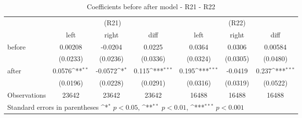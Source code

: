 \begin{table}[!ht]\centering \footnotesize
\def\sym#1{\ifmmode^{#1}\else\(^{#1}\)\fi}
\caption{Coefficients before after model - R21 - R22}
\begin{tabular}{l*{6}{c}}
\hline\hline
                    &\multicolumn{3}{c}{(R21)}&\multicolumn{3}{c}{(R22)}\\
&\multicolumn{1}{c}{left}&\multicolumn{1}{c}{right}&\multicolumn{1}{c}{diff}&\multicolumn{1}{c}{left}&\multicolumn{1}{c}{right}&\multicolumn{1}{c}{diff}\\
\hline
before              &     0.00208         &     -0.0204         &      0.0225         &      0.0364         &      0.0306         &     0.00584         \\
                    &    (0.0233)         &    (0.0236)         &    (0.0336)         &    (0.0324)         &    (0.0305)         &    (0.0480)         \\
[0.5em]
after               &      0.0576\sym{**} &     -0.0572\sym{*}  &       0.115\sym{***}&       0.195\sym{***}&     -0.0419         &       0.237\sym{***}\\
                    &    (0.0196)         &    (0.0228)         &    (0.0291)         &    (0.0316)         &    (0.0319)         &    (0.0522)         \\
\hline
Observations        &       23642         &       23642         &       23642         &       16488         &       16488         &       16488         \\
\hline\hline
\multicolumn{7}{l}{ Standard errors in parentheses \sym{*} \(p<0.05\), \sym{**} \(p<0.01\), \sym{***} \(p<0.001\)}\\
\end{tabular}
\end{table}
